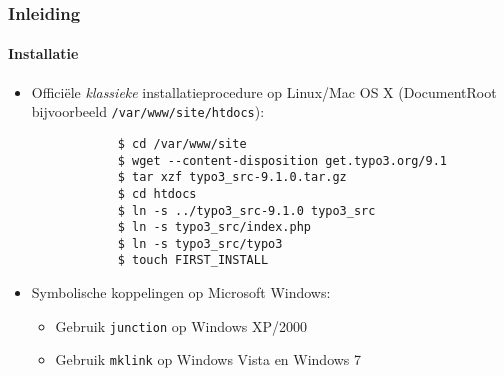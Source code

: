 \begin{frame}[fragile]
	\frametitle{Inleiding}
	\framesubtitle{Installatie}

	\begin{itemize}
		\item Officiële \textit{klassieke} installatieprocedure op Linux/Mac OS X\newline
			(DocumentRoot bijvoorbeeld \texttt{/var/www/site/htdocs}):
		\begin{lstlisting}
			$ cd /var/www/site
			$ wget --content-disposition get.typo3.org/9.1
			$ tar xzf typo3_src-9.1.0.tar.gz
			$ cd htdocs
			$ ln -s ../typo3_src-9.1.0 typo3_src
			$ ln -s typo3_src/index.php
			$ ln -s typo3_src/typo3
			$ touch FIRST_INSTALL
		\end{lstlisting}

		\item Symbolische koppelingen op Microsoft Windows:

			\begin{itemize}
				\item Gebruik \texttt{junction} op Windows XP/2000
                				\item Gebruik \texttt{mklink} op Windows Vista en Windows 7
			\end{itemize}

	\end{itemize}
\end{frame}

